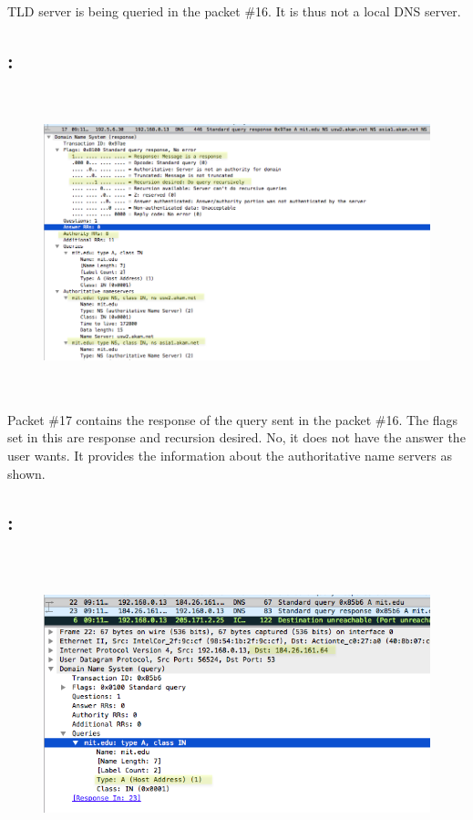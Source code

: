 \documentclass[]{report}
\begin{document}
TLD server is being queried in the packet \#16. It is thus not a local DNS server. 

\subsection{:}
\begin{figure}[H]
	\vspace{0pt}
	\includegraphics[height = 250pt, keepaspectratio]{Snapshots/q3/3_8.png}
\end{figure}
Packet \#17 contains the response of the query sent in the packet \#16. The flags set in this are response and recursion desired. No, it does not have the answer the user wants. It provides the information about the authoritative name servers as shown.

\subsection{:}
\begin{figure}[H]
	\vspace{0pt}
	\includegraphics[height = 250pt, keepaspectratio]{Snapshots/q3/3_9.png}
\end{figure}
\end{document}
